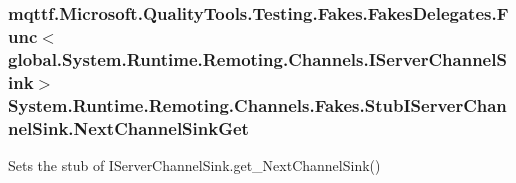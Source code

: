\hypertarget{class_system_1_1_runtime_1_1_remoting_1_1_channels_1_1_fakes_1_1_stub_i_server_channel_sink_a40df6d5a224adcde8ae068d8e1484b47}{
\subsubsection[{Next\-Channel\-Sink\-Get}]{\setlength{\rightskip}{0pt plus 5cm}mqttf.\-Microsoft.\-Quality\-Tools.\-Testing.\-Fakes.\-Fakes\-Delegates.\-Func$<$global.\-System.\-Runtime.\-Remoting.\-Channels.\-I\-Server\-Channel\-Sink$>$ System.\-Runtime.\-Remoting.\-Channels.\-Fakes.\-Stub\-I\-Server\-Channel\-Sink.\-Next\-Channel\-Sink\-Get}}\label{class_system_1_1_runtime_1_1_remoting_1_1_channels_1_1_fakes_1_1_stub_i_server_channel_sink_a40df6d5a224adcde8ae068d8e1484b47}


Sets the stub of I\-Server\-Channel\-Sink.\-get\-\_\-\-Next\-Channel\-Sink()

